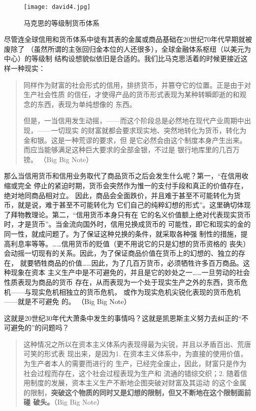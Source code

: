 \begin{figure}
\centering
\texttt{[image: david4.jpg]}
\caption{马克思的等级制货币体系}
\label{fig:david4}
\end{figure}

尽管连全球信用和货币体系中徒有其表的金属或商品基础在20世纪70年代早期就被废除了
（虽然所谓的主张回归金本位的人还很多），全球金融体系枢纽（以美元为中心）的等级制
结构设想貌似依旧是合适的。我们比马克思活着的时候更接近这样一种现实：

\begin{quotation}
  同样作为财富的社会形式的信用，排挤货币，并篡夺它的位置。正是由于对生产社会性质
  的信任，才使得产品的货币形式表现为某种转瞬即逝的和观念的东西，表现为单纯想像的
  东西。

  但是，一当信用发生动摇，——而这个阶段总是必然地在现代产业周期中出现，——一切现实
  的财富就都会要求现实地、突然地转化为货币，转化为金和银。这是一种荒谬的要求，但
  是它必然会由这个制度本身产生出来。而应当能够满足这种巨大要求的全部金银，不过是
  银行地库里的几百万镑。 （Big Big Note）

\end{quotation}

那么当信用货币和信用业务取代了商品货币之后会发生什么呢？第一，“在信用收缩或完全
停止的紧迫时期，货币会突然作为惟一的支付手段和真正的价值存在，绝对地同商品相对立。
因此，商品会全面跌价，并且难于甚至不可能转化为货币，就是说，难于甚至不可能转化为
它们自己的纯粹幻想的形式”。这里确切体现了拜物教理论。第二，“信用货币本身只有在
它的名义价值额上绝对代表现实货币时，才是货币”。当金流向国外时，信用兑换成货币的
可能性，即它和现实的金的同一性，就成问题了。为了保证这种兑换的条件，就采取各种强
制性的措施，提高利息率等等。……信用货币的贬值（更不用说它的只是幻想的货币资格的
丧失）会动摇一切现有的关系。因此，为了保证商品价值在货币上的幻想的、独立的存在，
就要牺牲商品的价值……因此，为了几百万货币，必须牺牲许多百万商品。这种现象在资本
主义生产中是不可避免的，并且是它的妙处之一……一旦劳动的社会性质表现为商品的货币
存在，从而表现为一个处于现实生产之外的东西，货币危机——与现实危机相独立的货币危机，
或作为现实危机尖锐化表现的货币危机——就是不可避免
的。 （Big Big Note）

这就是20世纪30年代大萧条中发生的事情吗？这就是凯恩斯主义努力去纠正的“不可避免的”的问题吗？

\begin{quotation}
  这种情况之所以在资本主义体系内表现得最为尖锐，并且以矛盾百出、荒唐可笑的形式表
  现出来，是因为1. 在资本主义体系中，为直接的使用价值，为生产者本人的需要而进行的
  生产，已经完全废止，因此，财富只是作为社会过程而存在，这个社会过程表现为生产和
  流通的错综交织；2. 随着信用制度的发展，资本主义生产不断地企图突破对财富及其运动
  的这个金属的限制，\textbf{突破这个物质的同时又是幻想的限制，但又不断地在这个限制面前碰
  破头。}（Big Big Note）

\end{quotation}


